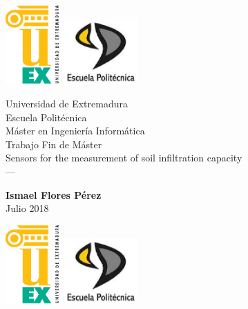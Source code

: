\setlength{\unitlength}{1 cm} %
\thispagestyle{empty}

\begin{center}
\includegraphics[height=3cm]{IMGS/LOGO_UNEX.eps} \hspace*{8cm}
\includegraphics[height=2.5cm]{IMGS/LOGO_EPCC.eps}
\vspace*{1cm}
\end{center}


\begin{center}
{\huge Universidad de Extremadura}\\[0.5cm]
{\LARGE Escuela Politécnica}\\[1.25cm]
{\Large Máster en Ingeniería Informática}\\[1.25cm]
{\Large Trabajo Fin de Máster}\\[2.5cm]
{\huge Sensors for the measurement of soil infiltration capacity\\\vspace*{0.3cm}
---}\\[2cm]
\end{center}

\begin{flushright}
\vspace*{1cm}
{\large \textbf{Ismael Flores Pérez}}\\
{\large Julio 2018}\\
\end{flushright}


\afterpage{\blankpage}
\newpage


\thispagestyle{empty}

\begin{center}
\includegraphics[height=3cm]{IMGS/LOGO_UNEX.eps} \hspace*{8cm}
\includegraphics[height=2.5cm]{IMGS/LOGO_EPCC.eps}
\vspace*{0.7cm}
\end{center}



